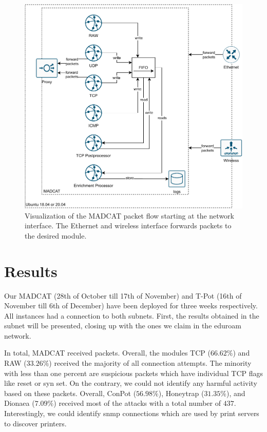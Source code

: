 \begin{figure}
    \centering
    \includegraphics[width=\textwidth]{figures/heicat-architecture.pdf}
    \caption[Visualization of the MADCAT packet flow]{
        Visualization of the MADCAT packet flow starting at the network interface.
        The Ethernet and wireless interface forwards packets to the desired module.
    }
    \label{fig:madcat-architecture}
\end{figure}

\section{Results}

Our MADCAT (28th of October till 17th of November) and T-Pot (16th of November till 6th of December) have been deployed for three weeks respectively.
All instances had a connection to both subnets.
First, the results obtained in the subnet  will be presented, closing up with the ones we claim in the eduroam network.

In total, MADCAT received  packets.
Overall, the modules TCP ($66.62\%$) and RAW ($33.26\%$) received the majority of all connection attempts.
The minority with less than one percent are suspicious packets which have individual TCP flags like reset or syn set. 
On the contrary, we could not identify any harmful activity based on these packets.
Overall, ConPot ($56.98\%$), Honeytrap ($31.35\%$), and Dionaea ($7.09\%$) received most of the attacks with a total number of $437$.
Interestingly, we could identify \ac{snmp} connections which are used by print servers to discover printers.

